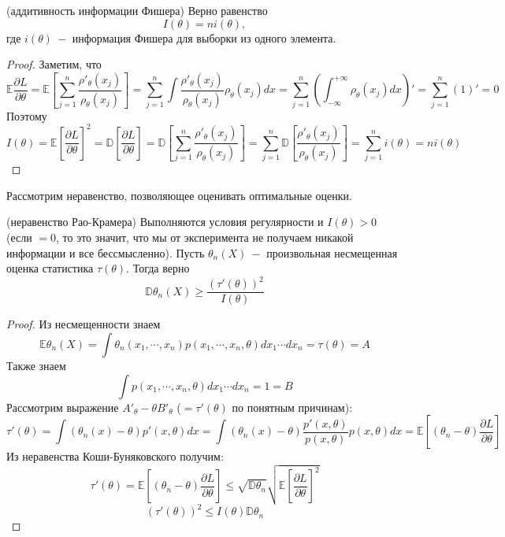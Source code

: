 \begin{advice}(аддитивность информации Фишера) Верно равенство
\[
    I\left(\theta\right) = n i\left(\theta\right),
\]
где $i\left(\theta\right) \ - $ информация Фишера для выборки из одного элемента.
\end{advice}
\begin{proof}
Заметим, что 
\[
    \mathbb{E} \frac{\partial L}{\partial \theta} = \mathbb{E}\left[\sum_{j = 1}^{n} \frac{\rho'_\theta\left(x_j\right)}{\rho_\theta\left(x_j\right)}\right] = \sum_{j =1}^{n} \int \frac{\rho'_\theta\left(x_j\right)}{\rho_\theta\left(x_j\right)} \rho_\theta\left(x_j\right) dx = 
    \sum_{j = 1}^{n} \left(\int_{-\infty}^{+\infty} \rho_\theta\left(x_j\right) dx\right)' = \sum_{j = 1}^{n} \left(1\right)' = 0
\]
Поэтому 
\[
    I\left(\theta\right) = \mathbb{E} \left[\frac{\partial L}{\partial \theta}\right] ^ 2 = \mathbb{D} \left[\frac{\partial L}{\partial \theta}\right] = \mathbb{D} \left[\sum_{j = 1}^{n} \frac{\rho'_\theta\left(x_j\right)}{\rho_\theta\left(x_j\right)}\right] = \sum_{j = 1}^n \mathbb{D} \left[\frac{\rho'_\theta\left(x_j\right)}{\rho_\theta\left(x_j\right)}\right] = \sum_{j = 1}^n i\left(\theta\right) = ni\left(\theta\right)
\]
\end{proof}

Рассмотрим неравенство, позволяющее оценивать оптимальные оценки.
\begin{theorem} (неравенство Рао-Крамера) Выполняются условия регулярности и $I\left(\theta\right) > 0$ (если $= 0$, то это значит, что мы от эксперимента не получаем никакой информации и все бессмысленно). Пусть $\theta_n\left(X\right) \ - $ произвольная несмещенная оценка статистика $\tau\left(\theta\right)$. Тогда верно
\[
    \mathbb{D} \theta_n\left(X\right) \geq \frac{\left(\tau'\left(\theta\right)\right) ^ 2}{I\left(\theta\right)}
\]
\end{theorem}
\begin{proof}
Из несмещенности знаем 
\[
    \mathbb{E} \theta_n\left(X\right) = \int \theta_n\left(x_1, \cdots, x_n\right) p\left(x_1, \cdots, x_n, \theta\right) dx_1 \cdots d x_n = \tau\left(\theta\right) = A
\]
Также знаем
\[
    \int p\left(x_1, \cdots, x_n, \theta\right) dx_1 \cdots d x_n = 1 = B
\]
Рассмотрим выражение $A'_\theta - \theta B'_\theta$ ($= \tau'\left(\theta\right)$ по понятным причинам):
\[
    \tau'\left(\theta\right) = \int \left(\theta_n\left(x\right) - \theta\right) p'\left(x, \theta\right) dx = \int \left(\theta_n\left(x\right) - \theta\right) \frac{p'\left(x, \theta\right)}{p\left(x, \theta\right)} p\left(x, \theta\right) dx = \mathbb{E} \left[\left(\theta_n - \theta\right) \frac{\partial L}{\partial \theta}\right]
\]
Из неравенства Коши-Буняковского получим: 
\[
    \tau'\left(\theta\right) = \mathbb{E} \left[\left(\theta_n - \theta\right) \frac{\partial L}{\partial \theta}\right] \leq \sqrt{\mathbb{D} \theta_n} \sqrt{\mathbb{E} \left[\frac{\partial L}{\partial \theta}\right] ^ 2}
\]\[
    \left(\tau'\left(\theta\right)\right) ^ 2 \leq I\left(\theta\right)\mathbb{D} \theta_n 
\]
\end{proof}

